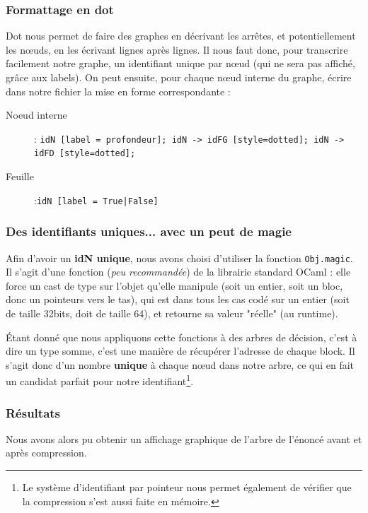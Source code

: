 \documentclass[12pt,a4paper]{article}
\begin{document}
\subsubsection{Formattage en dot}

Dot nous permet de faire des graphes en décrivant les arrêtes, et potentiellement les nœuds, en les écrivant lignes après lignes. Il nous faut donc, pour transcrire facilement notre graphe, un identifiant unique par nœud (qui ne sera pas affiché, grâce aux labels). On peut ensuite, pour chaque nœud interne du graphe, écrire dans notre fichier la mise en forme correspondante : 

\begin{description}
\item[Noeud interne]  : \texttt{idN [label = profondeur];
 idN -> idFG [style=dotted]; 
 idN -> idFD [style=dotted];}
 
 \item [Feuille] :\texttt{idN [label = True|False]}
\end{description}


\subsubsection{Des identifiants uniques... avec un peut de magie}
Afin d'avoir un \textbf{idN unique}, nous avons choisi d'utiliser la fonction \texttt{Obj.magic}. Il s'agit d'une fonction (\textit{peu recommandée}) de la librairie standard OCaml : elle force un cast de type sur l'objet qu'elle manipule (soit un entier, soit un bloc, donc un pointeurs vers le tas), qui est dans tous les cas codé sur un entier (soit de taille 32bits, doit de taille 64), et retourne sa valeur "réelle" (au runtime). 

Étant donné que nous appliquons cette fonctions à des arbres de décision, c'est à dire un type somme, c'est une manière de récupérer l'adresse de chaque block. Il s'agit donc d'un nombre \textbf{unique} à chaque nœud dans notre arbre, ce qui en fait un candidat parfait pour notre identifiant\footnote{Le système d'identifiant par pointeur nous permet également de vérifier que la compression s'est aussi faite en mémoire.}.


\subsubsection{Résultats}

Nous avons alors pu obtenir un affichage graphique de l'arbre de l'énoncé avant et après compression. 
\end{document}
